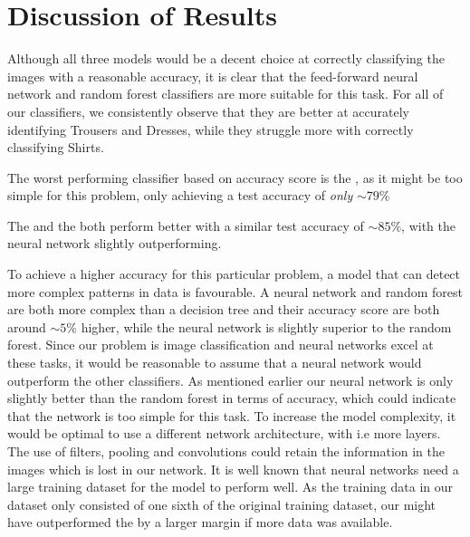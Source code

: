 \section{Discussion of Results}
Although all three models would be a decent choice at correctly classifying the images with a reasonable accuracy, it is clear that the feed-forward neural network and random forest classifiers are more suitable for this task.
For all of our classifiers, we consistently observe that they are better at accurately identifying Trousers and Dresses, while they struggle more with correctly classifying Shirts.
\newline

The worst performing classifier based on accuracy score is the , as it might be too simple for this problem, only achieving a test accuracy of \textit{only} $\sim79\%$
\newline

The  and the  both perform better with a similar test accuracy of $\sim85\%$, with the neural network slightly outperforming.
\newline

To achieve a higher accuracy for this particular problem, a model that can detect more complex patterns in data is favourable.
A neural network and random forest are both more complex than a decision tree and their accuracy score are both around $\sim5\%$ higher,
while the neural network is slightly superior to the random forest.
\newline
Since our problem is image classification and neural networks excel at these tasks, it would be reasonable to assume that a neural network would outperform the other classifiers.
As mentioned earlier our neural network is only slightly better than the random forest in terms of accuracy, which could indicate that the network is too simple for this task.
To increase the model complexity, it would be optimal to use a different network architecture, with i.e more layers.
The use of filters, pooling and convolutions could retain the information in the images which is lost in our network.
It is well known that neural networks need a large training dataset for the model to perform well.
As the training data in our dataset only consisted of one sixth of the original training dataset,
our  might have outperformed the  by a larger margin if more data was available.


